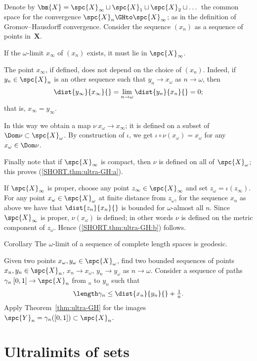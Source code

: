 Denote by $\bm{X}=\spc{X}_\infty\sqcup\spc{X}_1\sqcup\spc{X}_2\sqcup\dots$ the common space for the convergence $\spc{X}_n\GHto \spc{X}_\infty$;
as in the definition of Gromov--Hausdorff convergence.
Consider the sequence $(x_n)$ 
as a sequence of points in~$\bm{X}$.

If the $\omega$-limit $x_\infty$ of $(x_n)$ exists, 
it must lie in $\spc{X}_\infty$. 

The point $x_\infty$, if defined, does not depend on the choice of $(x_n)$.
Indeed, if $y_n\in\spc{X}_n$ is an other sequence such that $y_n\to x_\omega$ as $n\to\omega$, then 
\[
\dist{y_\infty}{x_\infty}{}=\lim_{n\to\omega}\dist{y_n}{x_n}{}=0;
\]
that is, $x_\infty=y_\infty$.


In this way we obtain a map $\nu\:x_\omega\to x_\infty$;
it is defined on a subset of $\Dom\nu \subset\spc{X}_\omega$.
By construction of $\iota$, 
we get  $\iota\circ\nu(x_\omega)=x_\omega$ for any $x_\omega\in \Dom\nu$.

Finally note that if $\spc{X}_\infty$ is compact, then $\nu$ is defined on all of $\spc{X}_\omega$;
this proves (\ref{SHORT.thm:ultra-GH:a}).

If $\spc{X}_\infty$ is proper, choose any point $z_\infty\in \spc{X}_\infty$
and set $z_\omega=\iota(z_\infty)$.
For any point $x_\omega\in \spc{X}_\omega$ at finite distance from $z_\omega$,
for the sequence $x_n$ 
as above we have that $\dist{z_n}{x_n}{}$ is bounded for $\omega$-almost all $n$.
Since $\spc{X}_\infty$ is proper, $\nu(x_\omega)$ is defined;
in other words $\nu$ is defined on the metric component of $z_\omega$.
Hence (\ref{SHORT.thm:ultra-GH:b}) follows.
\qeds

\begin{thm}{Corollary} 
\label{cor:ulara-geod}
The $\omega$-limit of a sequence of complete length spaces is geodesic.
\end{thm}

 Given two points $x_\omega,y_\omega\in \spc{X}_\omega$, find two bounded sequences of points $x_n,y_n\in \spc{X}_n$, $x_n\to x_\omega$, $y_n\to y_\omega$ as $n\to\omega$.
Consider a sequence of paths  $\gamma_n\:[0,1]\to \spc{X}_n$ from $_n$ to $y_n$
 such that 
\[\length\gamma_n\le \dist{x_n}{y_n}{}+\tfrac{1}{n}.\]
Apply Theorem~\ref{thm:ultra-GH} 
for the images $\spc{Y}_n=\gamma_n([0,1])\subset \spc{X}_n$.
\qeds

\section{Ultralimits of sets}

